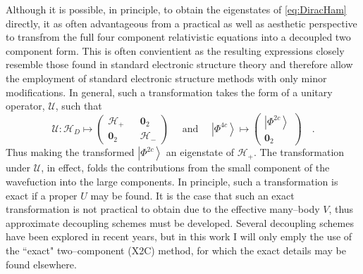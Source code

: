 \documentclass[12pt]{article}
\newcommand{\ket}[1]{\left\vert #1 \right\rangle}         %
\newcommand*\vc[1]{\boldsymbol{#1}}
\begin{document}
Although it is possible, in principle, to obtain the eigenstates of 
\cref{eq:DiracHam} directly, it as often advantageous from a practical as well
as aesthetic perspective to transfrom the full four component relativistic
equations into a decoupled two component form. This is often convientient as the
resulting expressions closely resemble those found in standard electronic
structure theory and therefore allow the employment of standard electronic
structure methods with only minor modifications. In general, such a
transformation takes the form of a unitary operator, $\mathscr{U}$, such that
\begin{equation}
\mathscr{U}: 
\mathscr{H}_D \mapsto \begin{pmatrix}
\mathscr{H}_+ && \vc{0}_2 \\ \vc{0}_2 && \mathscr{H}_- 
\end{pmatrix} \quad \text{ and } \quad
\ket{\Phi^{4c}} \mapsto \begin{pmatrix}
 \ket{\Phi^{2c}} \\ \vc{0}_2
\end{pmatrix} \quad.
\end{equation}
Thus making the transformed $\ket{\Phi^{2c}}$ an eigenstate of $\mathscr{H}_+$.
The transformation under $\mathscr{U}$, in effect, folds the contributions from
the small component of the wavefuction into the large components. In principle,
such a transformation is exact if a proper $U$ may be found. It is the case
that such an exact transformation is not practical to obtain due to the
effective many--body $V$, thus approximate decoupling schemes must be developed.
Several decoupling schemes have been explored in recent years, but in this work
I will only emply the use of the ``exact" two--component (X2C) method, for which
the exact details may be found elsewhere.
\end{document}
